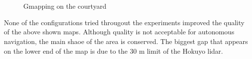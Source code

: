 \begin{figure}[t]
  \centering
   \quad
   \\
   \quad 
   \\  
  \caption{Gmapping on the courtyard}
  \label{fig:pevgmcouvar}
\end{figure}

None of the configurations tried througout the experiments improved the quality of the above shown maps. Although quality is not acceptable for autonomous navigation, the main shaoe of the area is conserved. The biggest gap that appears on the lower end of the map is due to the 30 m limit of the Hokuyo lidar.

